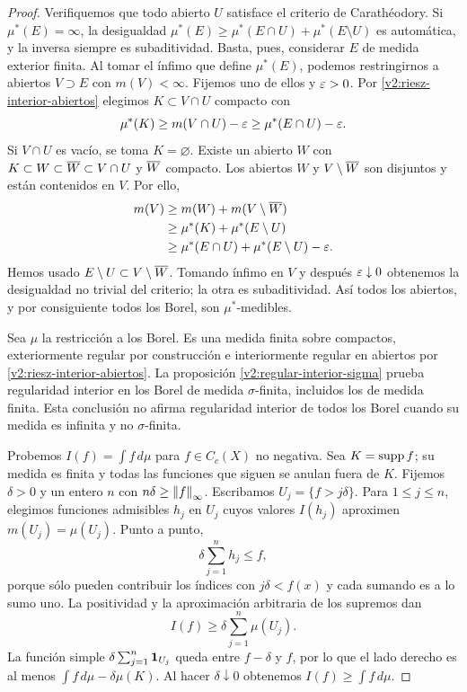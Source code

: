 \begin{proof}
Verifiquemos que todo abierto $U$ satisface el criterio de Carathéodory. Si $\mu^*(E)=\infty$, la desigualdad
$\mu^*(E)\ge\mu^*(E\cap U)+\mu^*(E\setminus U)$ es automática, y la inversa siempre es subaditividad. Basta, pues, considerar $E$ de medida exterior finita. Al tomar el ínfimo que define $\mu^*(E)$, podemos restringirnos a abiertos $V\supset E$ con $m(V)<\infty$. Fijemos uno de ellos y $\varepsilon>0$. Por \eqref{v2:riesz-interior-abiertos} elegimos $K\subset V\cap U$ compacto con
\[
 \mu^*(K)\ge m(V\cap U)-\varepsilon\ge\mu^*(E\cap U)-\varepsilon.
\]
Si $V\cap U$ es vacío, se toma $K=\varnothing$. Existe un abierto $W$ con $K\subset W\subset\overline{W}\subset V\cap U$ y $\overline{W}$ compacto. Los abiertos $W$ y $V\setminus\overline{W}$ son disjuntos y están contenidos en $V$. Por ello,
\begin{align*}
 m(V)&\ge m(W)+m(V\setminus\overline{W})\\
 &\ge\mu^*(K)+\mu^*(E\setminus U)\\
 &\ge\mu^*(E\cap U)+\mu^*(E\setminus U)-\varepsilon.
\end{align*}
Hemos usado $E\setminus U\subset V\setminus\overline{W}$. Tomando ínfimo en $V$ y después $\varepsilon\downarrow0$ obtenemos la desigualdad no trivial del criterio; la otra es subaditividad. Así todos los abiertos, y por consiguiente todos los Borel, son $\mu^*$-medibles.

Sea $\mu$ la restricción a los Borel. Es una medida finita sobre compactos, exteriormente regular por construcción e interiormente regular en abiertos por \eqref{v2:riesz-interior-abiertos}. La proposición \ref{v2:regular-interior-sigma} prueba regularidad interior en los Borel de medida $\sigma$-finita, incluidos los de medida finita. Esta conclusión no afirma regularidad interior de todos los Borel cuando su medida es infinita y no $\sigma$-finita.

Probemos $I(f)=\int f\,d\mu$ para $f\in C_c(X)$ no negativa. Sea $K=\operatorname{supp} f$; su medida es finita y todas las funciones que siguen se anulan fuera de $K$. Fijemos $\delta>0$ y un entero $n$ con $n\delta\ge\left\lVert f\right\rVert_\infty$. Escribamos $U_j=\{f>j\delta\}$. Para $1\le j\le n$, elegimos funciones admisibles $h_j$ en $U_j$ cuyos valores $I(h_j)$ aproximen $m(U_j)=\mu(U_j)$. Punto a punto,
\[
 \delta\sum_{j=1}^n h_j\le f,
\]
porque sólo pueden contribuir los índices con $j\delta<f(x)$ y cada sumando es a lo sumo uno. La positividad y la aproximación arbitraria de los supremos dan
\[
 I(f)\ge\delta\sum_{j=1}^n\mu(U_j).
\]
La función simple $\delta\sum_{j=1}^n\mathbf1_{U_j}$ queda entre $f-\delta$ y $f$, por lo que el lado derecho es al menos $\int f\,d\mu-\delta\mu(K)$. Al hacer $\delta\downarrow0$ obtenemos $I(f)\ge\int f\,d\mu$.


\end{proof}
